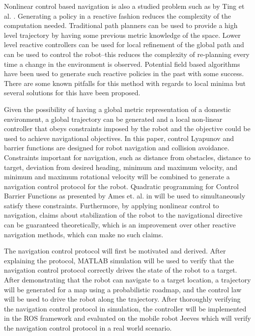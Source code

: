 \documentclass[conference]{IEEEtran}
\begin{document}
Nonlinear control based navigation is also a studied problem such as by Ting et al. \cite{ting2014reactive}. Generating a policy in a reactive fashion reduces the complexity of the computation needed. Traditional path planners can be used to provide a high level trajectory by having some previous metric knowledge of the space. Lower level reactive controllers can be used for local refinement of the global path and can be used to control the robot--this reduces the complexity of re-planning every time a change in the environment is observed. Potential field based algorithms have been used to generate such reactive policies in the past with some success. There are some known pitfalls for this method with regards to local minima but several solutions for this have been proposed.

Given the possibility of having a global metric representation of a domestic environment, a global trajectory can be generated and a local non-linear controller that obeys constraints imposed by the robot and the objective could be used to achieve navigational objectives. In this paper, control Lyapunov and barrier functions are designed for robot navigation and collision avoidance. Constraints important for navigation, such as distance from obstacles, distance to target, deviation from desired heading, minimum and maximum velocity, and minimum and maximum rotational velocity will be combined to generate a navigation control protocol for the robot. Quadratic programming for Control Barrier Functions as presented by Ames et. al. in \cite{amesACC} will be used to simultaneously satisfy these constraints. Furthermore, by applying nonlinear control to navigation, claims about stabilization of the robot to the navigational directive can be guaranteed theoretically, which is an improvement over other reactive navigation methods, which can make no such claims.
\fi

The navigation control protocol will first be motivated and derived. After explaining the protocol, MATLAB simulation will be used to verify that the navigation control protocol correctly drives the state of the robot to a target. After demonstrating that the robot can navigate to a target location, a trajectory will be generated for a map using a probabilistic roadmap, and the control law will be used to drive the robot along the trajectory. After thoroughly verifying the navigation control protocol in simulation, the controller will be implemented in the ROS framework and evaluated on the mobile robot Jeeves which will verify the navigation control protocol in a real world scenario.
\end{document}

